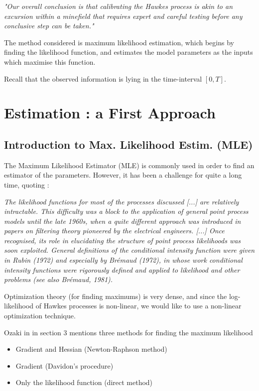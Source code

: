 \documentclass[11pt]{book}
\begin{document}
\textit{"Our overall conclusion is that calibrating the Hawkes process is akin to an excursion within a minefield that requires expert and careful testing before any conclusive step can be taken."}

The method considered is maximum likelihood estimation, which begins by finding the likelihood function, and estimates the model parameters as the inputs which maximise this function.

Recall that the observed information is lying in the time-interval $[0,T]$.
\chapter{Estimation : a First Approach}

\section{Introduction to Max. Likelihood Estim. (MLE)}

The Maximum Likelihood Estimator (MLE) is commonly used in order to find an estimator of the parameters. However, it has been a challenge for quite a long time, quoting \cite{daley}:

\textit{The likelihood functions for most of the processes discussed [...] are relatively intractable. This difficulty was a block to the application of general point process models until the late 1960s, when a quite different approach was introduced in papers on filtering theory pioneered by the electrical engineers. [...] Once recognised, its role in elucidating the structure of point process likelihoods was soon exploited. General definitions of the conditional intensity function were given in Rubin (1972) and especially by Brémaud (1972), in whose work conditional intensity functions were rigorously defined and applied to likelihood and other problems (see also Brémaud, 1981).}

Optimization theory (for finding maximums) is very dense, and since the log-likelihood of Hawkes processes is non-linear, we would like to use a non-linear optimization technique. 

Ozaki in \cite{Ozaki} in section 3 mentions three methods for finding the maximum likelihood

\begin{itemize}
\item Gradient and Hessian (Newton-Raphson method)
\item Gradient (Davidon's procedure)
\item Only the likelihood function (direct method)
\end{itemize}
\end{document}
